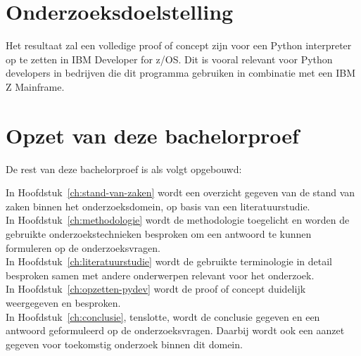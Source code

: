 \section{Onderzoeksdoelstelling}%
\label{sec:onderzoeksdoelstelling}

Het resultaat zal een volledige proof of concept zijn voor een Python interpreter op te zetten in IBM Developer for z/OS. Dit is vooral relevant voor Python developers in bedrijven die dit programma gebruiken in combinatie met een IBM Z Mainframe. 

\section{Opzet van deze bachelorproef}%
\label{sec:opzet-bachelorproef}


De rest van deze bachelorproef is als volgt opgebouwd:

In Hoofdstuk~\ref{ch:stand-van-zaken} wordt een overzicht gegeven van de stand van zaken binnen het onderzoeksdomein, op basis van een literatuurstudie. \\

In Hoofdstuk~\ref{ch:methodologie} wordt de methodologie toegelicht en worden de gebruikte onderzoekstechnieken besproken om een antwoord te kunnen formuleren op de onderzoeksvragen. \\

In Hoofdstuk~\ref{ch:literatuurstudie} wordt de gebruikte terminologie in detail besproken samen met andere onderwerpen relevant voor het onderzoek. \\

In Hoofdstuk~\ref{ch:opzetten-pydev} wordt de proof of concept duidelijk weergegeven en besproken. \\

In Hoofdstuk~\ref{ch:conclusie}, tenslotte, wordt de conclusie gegeven en een antwoord geformuleerd op de onderzoeksvragen. Daarbij wordt ook een aanzet gegeven voor toekomstig onderzoek binnen dit domein. \\